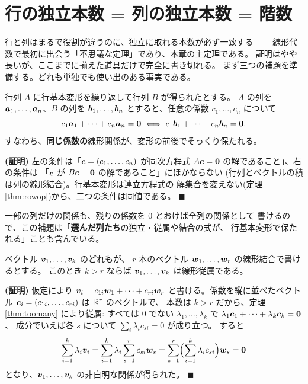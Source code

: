 \section{行の独立本数 = 列の独立本数 = 階数}

行と列はまるで役割が違うのに、独立に取れる本数が必ず一致する
――線形代数で最初に出会う「不思議な定理」であり、本章の主定理である。
証明はやや長いが、ここまでに揃えた道具だけで完全に書き切れる。
まず三つの補題を準備する。どれも単独でも使い出のある事実である。

\begin{teiri}[補題:行基本変形は列の線形関係を保つ]\label{thm:colrel}
行列 $A$ に行基本変形を繰り返して行列 $B$ が得られたとする。
$A$ の列を $\bm{a}_1, \dots, \bm{a}_n$、$B$ の列を
$\bm{b}_1, \dots, \bm{b}_n$ とすると、任意の係数
$c_1, \dots, c_n$ について
\[
c_1\bm{a}_1 + \cdots + c_n\bm{a}_n = \bm{0}
\iff
c_1\bm{b}_1 + \cdots + c_n\bm{b}_n = \bm{0}.
\]
すなわち、\textbf{同じ係数の}線形関係が、変形の前後でそっくり保たれる。
\end{teiri}

\noindent\textbf{(証明)}\quad
左の条件は「$\bm{c} = (c_1, \dots, c_n)$ が同次方程式
$A\bm{c} = \bm{0}$ の解であること」、右の条件は
「$\bm{c}$ が $B\bm{c} = \bm{0}$ の解であること」にほかならない
(行列とベクトルの積は列の線形結合)。行基本変形は連立方程式の
解集合を変えない(定理 \ref{thm:rowop})から、二つの条件は同値である。
 $\blacksquare$

一部の列だけの関係も、残りの係数を $0$ とおけば全列の関係として
書けるので、この補題は「\textbf{選んだ列たち}の独立・従属や結合の式が、
行基本変形で保たれる」ことも含んでいる。

\begin{teiri}[補題:張られる側は本数で勝てない]\label{thm:span-bound}
ベクトル $\bm{v}_1, \dots, \bm{v}_k$ のどれもが、
$r$ 本のベクトル $\bm{w}_1, \dots, \bm{w}_r$ の線形結合で書けるとする。
このとき $k > r$ ならば $\bm{v}_1, \dots, \bm{v}_k$ は線形従属である。
\end{teiri}

\noindent\textbf{(証明)}\quad
仮定により $\bm{v}_i = c_{1i}\bm{w}_1 + \cdots + c_{ri}\bm{w}_r$
と書ける。係数を縦に並べたベクトル
$\bm{c}_i = (c_{1i}, \dots, c_{ri})$ は $\mathbb{R}^r$ のベクトルで、
本数は $k > r$ だから、定理 \ref{thm:toomany} により従属:
すべては $0$ でない $\lambda_1, \dots, \lambda_k$ で
$\lambda_1\bm{c}_1 + \cdots + \lambda_k\bm{c}_k = \bm{0}$、
成分でいえば各 $s$ について $\sum_i \lambda_i c_{si} = 0$ が成り立つ。
すると
\[
\sum_{i=1}^{k} \lambda_i \bm{v}_i
= \sum_{i=1}^{k} \lambda_i \sum_{s=1}^{r} c_{si}\bm{w}_s
= \sum_{s=1}^{r} \Bigl( \sum_{i=1}^{k} \lambda_i c_{si} \Bigr) \bm{w}_s
= \bm{0}
\]
となり、$\bm{v}_1, \dots, \bm{v}_k$ の非自明な関係が得られた。
 $\blacksquare$

